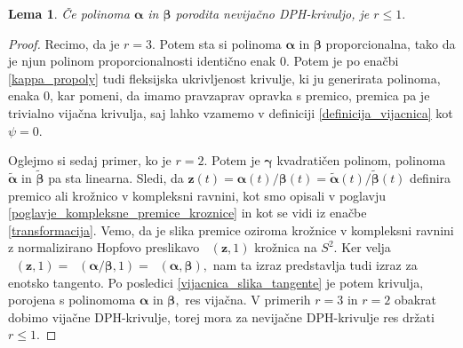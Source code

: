 \documentclass[12pt,a4paper,twoside]{article}
\theoremstyle{definition} %
\theoremstyle{plain} %
\newtheorem{lema}[definicija]{Lema}
\theoremstyle{primerstyle}
\numberwithin{equation}{section}  %
\newcommand{\zV}{\mathbf{z}}
\newcommand{\balpha}{\boldsymbol \alpha}
\newcommand{\bbeta}{\boldsymbol \beta}
\newcommand{\bgamma}{\boldsymbol \gamma}
\newcommand{\btalpha}{\tilde{\boldsymbol \alpha}}
\newcommand{\btbeta}{\tilde{\boldsymbol \beta}}
\DeclareMathOperator{\nhopf}{\hat{H}}
\begin{document}
\begin{lema}
	\label{lema_1}
	Če polinoma $\balpha$ in $\bbeta$ porodita nevijačno DPH-krivuljo, je $r \leq 1.$
\end{lema}
\begin{proof}
	Recimo, da je $r=3.$ Potem sta si polinoma $\balpha$ in $\bbeta$ proporcionalna, tako da je njun polinom proporcionalnosti identično enak 0. Potem je po enačbi \eqref{kappa_propoly} tudi fleksijska ukrivljenost krivulje, ki ju generirata polinoma, enaka 0, kar pomeni, da imamo pravzaprav opravka s premico, premica pa je trivialno vijačna krivulja, saj lahko vzamemo v definiciji \ref{definicija_vijacnica} kot $\psi=0.$
	
	Oglejmo si sedaj primer, ko je $r=2.$ Potem je $\bgamma$ kvadratičen polinom, polinoma $\btalpha$ in $\btbeta$ pa sta linearna. Sledi, da $\zV(t)=\balpha(t)/\bbeta(t)=\btalpha(t)/\btbeta(t)$ definira premico ali krožnico v kompleksni ravnini, kot smo opisali v poglavju \ref{poglavje_kompleksne_premice_kroznice} in kot se vidi iz enačbe \eqref{transformacija}. Vemo, da je slika premice oziroma krožnice v kompleksni ravnini z normalizirano Hopfovo preslikavo $\nhopf(\zV,1)$ krožnica na $S^2.$ Ker velja $\nhopf(\zV,1)=\nhopf(\balpha/\bbeta,1)=\nhopf(\balpha,\bbeta),$ nam ta izraz predstavlja tudi izraz za enotsko tangento. Po posledici \ref{vijacnica_slika_tangente} je potem krivulja, porojena s polinomoma $\balpha$ in $\bbeta,$ res vijačna. V primerih $r=3$ in $r=2$ obakrat dobimo vijačne DPH-krivulje, torej mora za nevijačne DPH-krivulje res držati $r \leq 1.$
\end{proof}
\end{document}
